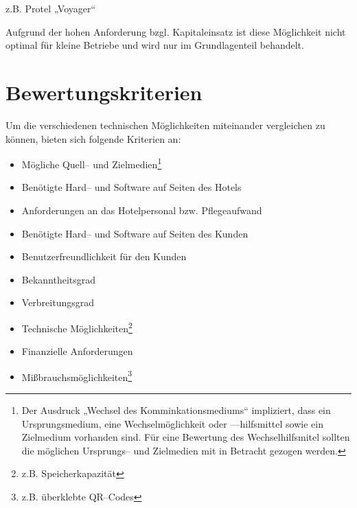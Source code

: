 z.B. Protel „Voyager“

Aufgrund der hohen Anforderung bzgl. Kapitaleinsatz ist diese Möglichkeit nicht optimal für kleine Betriebe und wird nur im Grundlagenteil behandelt.

\newpage
\section{Bewertungskriterien}
\label{sec:kriterien}

Um die verschiedenen technischen Möglichkeiten miteinander vergleichen zu können, bieten sich folgende Kriterien an:

\begin{itemize}
\item Mögliche Quell– und Zielmedien\footnote{Der Ausdruck „Wechsel des Komminkationsmediums“ impliziert, dass ein Ursprungsmedium, eine Wechselmöglichkeit oder —hilfsmittel sowie ein Zielmedium vorhanden sind. Für eine Bewertung des Wechselhilfsmitel sollten die möglichen Ursprungs– und Zielmedien mit in Betracht gezogen werden.}
\item Benötigte Hard-- und Software auf Seiten des Hotels
\item Anforderungen an das Hotelpersonal bzw. Pflegeaufwand
\item Benötigte Hard-- und Software auf Seiten des Kunden
\item Benutzerfreundlichkeit für den Kunden
\item Bekanntheitsgrad 
\item Verbreitungsgrad 
\item Technische Möglichkeiten\footnote{z.B. Speicherkapazität}
\item Finanzielle Anforderungen
\item Mißbrauchsmöglichkeiten\footnote{z.B. überklebte QR--Codes}
\end{itemize}

